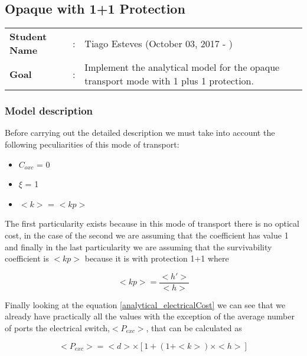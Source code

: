 \clearpage

\subsection{Opaque with 1+1 Protection}\label{analytical_Opaque_Protection}
\begin{tcolorbox}	
\begin{tabular}{p{2.75cm} p{0.2cm} p{10.5cm}} 	
\textbf{Student Name}  &:& Tiago Esteves    (October 03, 2017 - )\\
\textbf{Goal}          &:& Implement the analytical model for the opaque transport mode with 1 plus 1 protection.
\end{tabular}
\end{tcolorbox}

\subsubsection{Model description}

Before carrying out the detailed description we must take into account the following peculiarities of this mode of transport:
\begin{itemize}
  \item $C_{oxc}$ = 0
  \item $\xi$ = 1
  \item $<k>$ = $<kp>$
\end{itemize}

\vspace{11pt}
The first particularity exists because in this mode of transport there is no optical cost, in the case of the second we are assuming that the coefficient has value 1 and finally in the last particularity we are assuming that the survivability coefficient is $<kp>$ because it is with protection 1+1 where

\begin{equation}
<kp> = \frac{<h'>}{<h>}
\label{coefficient_protec}
\end{equation}

\vspace{11pt}
Finally looking at the equation \ref{analytical_electricalCost}  we can see that we already have practically all the values with the exception of the average number of ports the electrical switch,$<P_{exc}>$, that can be calculated as

\begin{equation}
<P_{exc}> = <d> \times [1 + \left(1 + <k>\right) \times <h>]
\label{Pexc_opaque_protec}
\end{equation}

